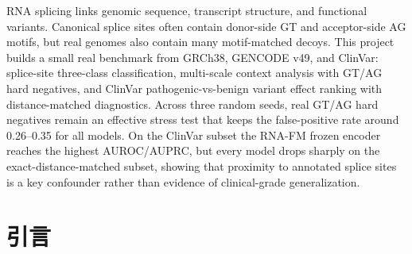 \documentclass[
    oneside,
    fontset = win,
  ]{njuthesis}
\begin{document}
\maketitle
\raggedbottom

\begin{abstract}
RNA 剪接是连接基因组序列、转录本结构与功能变异的重要分子过程。经典剪接位点通常包含 donor 侧的 GT 和 acceptor 侧的 AG 等局部共识序列，但是，真实剪接调控并不等价于对短 motif 的简单匹配：真实基因组中存在大量携带 GT/AG 却不被注释为剪接位点的诱饵序列，近剪接位点单核苷酸变异也可能改变剪接信号。围绕这一问题，本文基于 GRCh38、GENCODE v49 和 ClinVar 构建了一个小规模但真实的计算生物学 benchmark：首先建立 donor、acceptor 与 GT/AG hard-negative 三分类模型；随后比较不同上下文窗口下的识别性能；最后在 held-out chromosomes 上的 ClinVar pathogenic/likely pathogenic 与 benign/likely benign SNV 中评估变异效应排序，并用 exact-distance-matched 子集诊断距离混杂。结果表明，真实 GT/AG hard-negative 是有效压力测试；在 ClinVar 小样本上，RNA-FM frozen encoder + MLP 取得最高 AUROC/AUPRC，但 distance-matched 结果明显下降，说明近剪接距离仍是重要混杂因素。
\end{abstract}

\begin{abstract*}
RNA splicing links genomic sequence, transcript structure, and functional variants. Canonical splice sites often contain donor-side GT and acceptor-side AG motifs, but real genomes also contain many motif-matched decoys. This project builds a small real benchmark from GRCh38, GENCODE v49, and ClinVar: splice-site three-class classification, multi-scale context analysis with GT/AG hard negatives, and ClinVar pathogenic-vs-benign variant effect ranking with distance-matched diagnostics. Across three random seeds, real GT/AG hard negatives remain an effective stress test that keeps the false-positive rate around 0.26--0.35 for all models. On the ClinVar subset the RNA-FM frozen encoder reaches the highest AUROC/AUPRC, but every model drops sharply on the exact-distance-matched subset, showing that proximity to annotated splice sites is a key confounder rather than evidence of clinical-grade generalization.
\end{abstract*}

\tableofcontents

\mainmatter

\chapter{引言}
\end{document}
